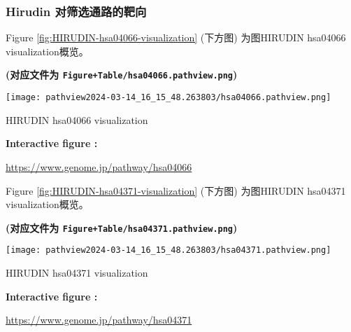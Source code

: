 \documentclass[
]{article}
\begin{document}
\hypertarget{hi-t}{%
\subsubsection{Hirudin 对筛选通路的靶向}\label{hi-t}}

Figure \ref{fig:HIRUDIN-hsa04066-visualization} (下方图) 为图HIRUDIN hsa04066 visualization概览。

\textbf{(对应文件为 \texttt{Figure+Table/hsa04066.pathview.png})}

\def\@captype{figure}
\begin{center}
\texttt{[image: pathview2024-03-14\_16\_15\_48.263803/hsa04066.pathview.png]}
\caption{HIRUDIN hsa04066 visualization}\label{fig:HIRUDIN-hsa04066-visualization}
\end{center}
\begin{center}\begin{tcolorbox}[colback=gray!10, colframe=gray!50, width=0.9\linewidth, arc=1mm, boxrule=0.5pt]
\textbf{
Interactive figure
:}

\vspace{0.5em}

    \url{https://www.genome.jp/pathway/hsa04066}

\vspace{2em}
\end{tcolorbox}
\end{center}

Figure \ref{fig:HIRUDIN-hsa04371-visualization} (下方图) 为图HIRUDIN hsa04371 visualization概览。

\textbf{(对应文件为 \texttt{Figure+Table/hsa04371.pathview.png})}

\def\@captype{figure}
\begin{center}
\texttt{[image: pathview2024-03-14\_16\_15\_48.263803/hsa04371.pathview.png]}
\caption{HIRUDIN hsa04371 visualization}\label{fig:HIRUDIN-hsa04371-visualization}
\end{center}
\begin{center}\begin{tcolorbox}[colback=gray!10, colframe=gray!50, width=0.9\linewidth, arc=1mm, boxrule=0.5pt]
\textbf{
Interactive figure
:}

\vspace{0.5em}

    \url{https://www.genome.jp/pathway/hsa04371}

\vspace{2em}
\end{tcolorbox}
\end{center}
\end{document}
